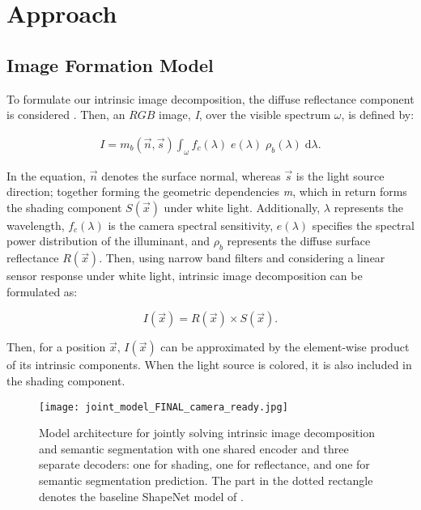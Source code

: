 \documentclass[runningheads]{llncs}
\begin{document}
\section{Approach}

\subsection{Image Formation Model}
To formulate our intrinsic image decomposition, the diffuse reflectance component is considered \cite{shafer}. Then, an $RGB$ image, \textit{I}, over the visible spectrum $\omega$, is defined by:

\begin{equation} \label{eq:brdf2}
\begin{aligned}
I = m_b(\vec{n}, \vec{s}) \int_{\omega}^{} f_{c}(\lambda)\;e(\lambda)\;\rho_{b}(\lambda)\; \mathrm{d}\lambda .
\end{aligned}
\end{equation}

\noindent In the equation, $\vec{n}$ denotes the surface normal, whereas $\vec{s}$ is the light source direction; together forming the geometric dependencies \textit{m}, which in return forms the shading component $S(\vec{x})$ under white light. Additionally, $\lambda$ represents the wavelength, $f_{c}(\lambda)$ is the camera spectral sensitivity, $e(\lambda)$ specifies the spectral power distribution of the illuminant, and $\rho_{b}$ represents the diffuse surface reflectance $R(\vec{x})$. Then, using narrow band filters and considering a linear sensor response under white light, intrinsic image decomposition can be formulated as:

\begin{equation} \label{eq:iid}
I(\vec{x}) = R(\vec{x}) \times S(\vec{x}) .
\end{equation}

\noindent Then, for a position $\vec{x}$, $I(\vec{x})$ can be approximated by the element-wise product of its intrinsic components. When the light source is colored, it is also  included in the shading component.

\begin{figure*}[t]
\texttt{[image: joint\_model\_FINAL\_camera\_ready.jpg]}
\centering
\caption{Model architecture for jointly solving intrinsic image decomposition and semantic segmentation with one shared encoder and three separate decoders:  one for shading, one
for reflectance, and one for semantic segmentation prediction. The part in the dotted rectangle denotes the baseline ShapeNet model of \cite{shi}.}
\label{fig:joint_model}
\end{figure*}
\end{document}
